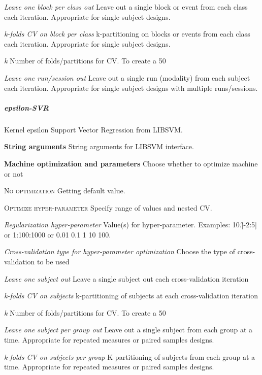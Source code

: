 \textit{Leave one block per class out}
Leave out a single block or event from each class each iteration. Appropriate for single subject designs.


\textit{k-folds CV on block per class}
k-partitioning on blocks or events from each class each iteration. Appropriate for single subject designs.


\textit{k}
Number of folds/partitions for CV. To create a 50%


\textit{Leave one run/session out}
Leave out a single run (modality) from each subject each iteration. Appropriate for single subject designs with multiple runs/sessions.


\subparagraph{epsilon-SVR}
Kernel epsilon Support Vector Regression from LIBSVM.


\textbf{String arguments}
String arguments for LIBSVM interface.


\textbf{Machine optimization and parameters}
Choose whether to optimize machine or not


\textsc{No optimization}
Getting default value.


\textsc{Optimize hyper-parameter}
Specify range of values and nested CV.


\textsl{Regularization hyper-parameter}
Value(s) for hyper-parameter. Examples: 10.\^[-2:5] or 1:100:1000 or 0.01 0.1 1 10 100.


\textsl{Cross-validation type for hyper-parameter optimization}
Choose the type of cross-validation to be used


\textit{Leave one subject out}
Leave a single subject out each cross-validation iteration


\textit{k-folds CV on subjects}
k-partitioning of subjects at each cross-validation iteration


\textit{k}
Number of folds/partitions for CV. To create a 50%


\textit{Leave one subject per group out}
Leave out a single subject from each group at a time. Appropriate for repeated measures or paired samples designs.


\textit{k-folds CV on subjects per group}
K-partitioning of subjects from each group at a time. Appropriate for repeated measures or paired samples designs.


